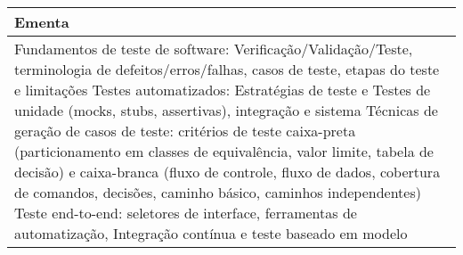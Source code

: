 \begin{quadro}[ht!]
\begin{tabular}{|p{3cm} p{2cm} p{3cm} p{2cm} p{3cm} p{2cm}|}
\multicolumn{6}{|p{15cm}|}{\cellcolor{blue1} Ementa} \\\hline
\hline\multicolumn{6}{|p{15cm}|}{\scriptsize Fundamentos de teste de software: Verificação/Validação/Teste, terminologia de defeitos/erros/falhas, casos de teste, etapas do teste e limitações Testes automatizados: Estratégias de teste e Testes de unidade (mocks, stubs, assertivas), integração e sistema Técnicas de geração de casos de teste: critérios de teste caixa-preta (particionamento em classes de equivalência, valor limite, tabela de decisão) e caixa-branca (fluxo de controle, fluxo de dados, cobertura de comandos, decisões, caminho básico, caminhos independentes) Teste end-to-end: seletores de interface, ferramentas de automatização, Integração contínua e teste baseado em modelo}\\\hline
\hline
	\end{tabular}
\end{quadro}
